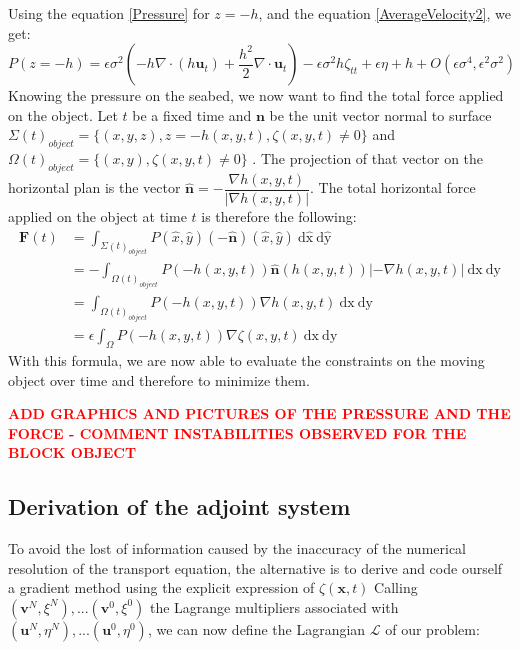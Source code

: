 \documentclass[11pt,a4paper]{article}
\begin{document}
	Using the equation \eqref{Pressure} for $ z = -h$, and the equation \eqref{AverageVelocity2}, we get:
	\begin{equation}
		P(z=-h) = \epsilon \sigma^2(-h\nabla \cdot (h \mathbf{u}_t) + \frac{h^2}{2} \nabla \cdot \mathbf{u}_t) - \epsilon \sigma^2 h \zeta_{tt} + \epsilon \eta + h + O(\epsilon\sigma^4, \epsilon^2 \sigma^2)
	\end{equation}	
	Knowing the pressure on the seabed, we now want to find the total force applied on the object.	Let $t$ be a fixed time and $\mathbf{n}$ be the unit vector normal to surface $\Sigma(t)_{object} = \{(x,y,z), z = - h(x,y,t), \zeta(x,y,t)\neq 0 \} $ and $\Omega(t)_{object} = \{(x,y), \zeta(x,y,t)\neq 0 \} $ . The projection of that vector on the horizontal plan is the vector $\hat{\mathbf{n}} = - \dfrac{\nabla h(x,y,t)}{|\nabla h(x,y,t)|}$. The total horizontal force applied on the object at time $t$ is therefore the following: 
	\begin{align*}
		\mathbf{F}(t) &= \int_{\Sigma(t)_{object}}{\! P(\hat{x}, \hat{y}) (-\hat{\mathbf{n}})(\hat{x},\hat{y}) \: \mathrm{d\hat{x}}\:\mathrm{d\hat{y}}}\\
		 & = - \int_{\Omega(t)_{object}}{\! P(-h(x,y,t)) \hat{\mathbf{n}}(h(x,y,t)) |-\nabla h(x,y,t)| \: \mathrm{dx}\:\mathrm{dy}}\\
		 & = \int_{\Omega(t)_{object}}{\! P(-h(x,y,t)) \nabla h(x,y,t) \: \mathrm{dx}\:\mathrm{dy}}\\
		 & = \epsilon \int_{\Omega}{\! P(-h(x,y,t)) \nabla \zeta(x,y,t) \: \mathrm{dx}\:\mathrm{dy}}
	\end{align*}	
	With this formula, we are now able to evaluate the constraints on the moving object over time and therefore to minimize them.
	
\textbf{	\textcolor{red}{ADD GRAPHICS AND PICTURES OF THE PRESSURE AND THE FORCE - COMMENT INSTABILITIES OBSERVED FOR THE BLOCK OBJECT}	}

\subsection{Derivation of the adjoint system}
	To avoid the lost of information caused by the inaccuracy of the numerical resolution of the transport equation, the alternative is to derive and code ourself a gradient method using the explicit expression of $\zeta(\mathbf{x},t)$
	Calling $(\mathbf{v}^N, \xi^N), ... (\mathbf{v}^0, \xi^0)$ the Lagrange multipliers associated with $(\mathbf{u}^N, \eta^N), ... (\mathbf{u}^0, \eta^0)$, we can now define the Lagrangian $\mathcal{L} $ of our problem: 
		
\end{document}

